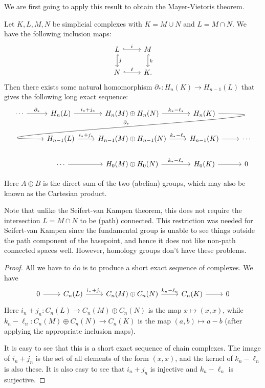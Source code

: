 \documentclass[a4paper]{article}
\begin{document}
We are first going to apply this result to obtain the Mayer-Vietoris theorem.
\begin{thm}
  Let $K, L, M, N$ be simplicial complexes with $K = M\cup N$ and $L = M\cap N$. We have the following inclusion maps:
  \[
    \begin{tikzcd}
      L \ar[r, hook, "i"] \ar[d, hook, "j"] & M\ar[d, hook, "k"]\\
      N \ar[r, hook, "\ell"] & K.
    \end{tikzcd}
  \]
  Then there exists some natural homomorphism $\partial_*: H_n(K) \to H_{n - 1}(L)$ that gives the following long exact sequence:
  \[
    \begin{tikzcd}
      \cdots \ar[r, "\partial_*"] & H_n(L) \ar[r, "i_* + j_*"] & H_n(M) \oplus H_n(N) \ar[r, "k_* - \ell_*"] & H_n(K)\ar[out=0, in=180, looseness=2, overlay, lld, "\partial_*"']\\
      & H_{n - 1}(L) \ar[r, "i_* + j_*"] & H_{n - 1}(M) \oplus H_{n - 1}(N) \ar[r, "k_* - \ell_*"] & H_{n - 1}(K) \ar [r] & \cdots\\
      &\cdots \ar[r] & H_0(M) \oplus H_0(N) \ar[r, "k_* - \ell_*"] & H_0(K) \ar [r] & 0
    \end{tikzcd}
  \]
\end{thm}
Here $A \oplus B$ is the direct sum of the two (abelian) groups, which may also be known as the Cartesian product.

Note that unlike the Seifert-van Kampen theorem, this does not require the intersection $L = M \cap N$ to be (path) connected. This restriction was needed for Seifert-van Kampen since the fundamental group is unable to see things outside the path component of the basepoint, and hence it does not like non-path connected spaces well. However, homology groups don't have these problems.

\begin{proof}
  All we have to do is to produce a short exact sequence of complexes. We have
  \[
    \begin{tikzcd}
      0 \ar[r] & C_n(L) \ar[r, "i_n + j_n"] & C_n(M) \oplus C_n(N) \ar[r, "k_n - \ell_n"] & C_n(K) \ar[r] & 0
    \end{tikzcd}
  \]
  Here $i_n + j_n: C_n(L) \to C_n(M) \oplus C_n(N)$ is the map $x \mapsto (x, x)$, while $k_n - \ell_n: C_n(M) \oplus C_n(N) \to C_n(K)$ is the map $(a, b) \mapsto a - b$ (after applying the appropriate inclusion maps).

  It is easy to see that this is a short exact sequence of chain complexes. The image of $i_n + j_n$ is the set of all elements of the form $(x, x)$, and the kernel of $k_n - \ell_n$ is also these. It is also easy to see that $i_n + j_n$ is injective and $k_n - \ell_n$ is surjective.
\end{proof}
\end{document}
